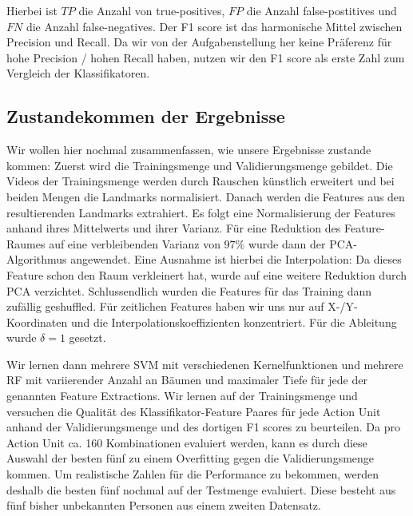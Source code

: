 Hierbei ist $TP$ die Anzahl von true-positives, $FP$ die Anzahl false-postitives und $FN$ die Anzahl false-negatives. Der F1 score ist das harmonische Mittel zwischen Precision und Recall. Da wir
von der Aufgabenstellung her keine Präferenz für hohe Precision / hohen Recall
haben, nutzen wir den F1 score als erste Zahl zum Vergleich der Klassifikatoren.

\subsection{Zustandekommen der Ergebnisse}
Wir wollen hier nochmal zusammenfassen, wie unsere Ergebnisse zustande kommen:
Zuerst wird die Trainingsmenge und Validierungsmenge gebildet.
Die Videos der Trainingsmenge werden durch Rauschen künstlich erweitert und bei beiden Mengen die Landmarks normalisiert.
Danach werden die Features aus den resultierenden Landmarks extrahiert.
Es folgt eine Normalisierung der Features anhand ihres Mittelwerts und ihrer Varianz. 
Für eine Reduktion des Feature-Raumes auf eine verbleibenden Varianz von $97\%$ wurde dann der PCA-Algorithmus angewendet.
Eine Ausnahme ist hierbei die Interpolation: Da dieses Feature schon den Raum verkleinert hat, wurde auf eine weitere Reduktion durch PCA verzichtet.
Schlussendlich wurden die Features für das Training dann zufällig geshuffled. Für zeitlichen Features haben wir uns nur auf X-/Y-Koordinaten und die Interpolationskoeffizienten konzentriert. Für die Ableitung wurde $\delta=1$ gesetzt.

Wir lernen dann mehrere SVM mit verschiedenen Kernelfunktionen und mehrere RF
mit variierender Anzahl an Bäumen und maximaler Tiefe für jede der genannten
Feature Extractions. Wir lernen auf der Trainingsmenge und versuchen die Qualität
des Klassifikator-Feature Paares für jede Action Unit anhand der
Validierungsmenge und des dortigen F1 scores zu beurteilen. Da pro Action Unit
ca. 160 Kombinationen evaluiert werden, kann es durch diese Auswahl der besten
fünf zu einem Overfitting gegen die Validierungsmenge kommen. Um realistische
Zahlen für die Performance zu bekommen, werden deshalb die besten fünf nochmal
auf der Testmenge evaluiert. Diese besteht aus fünf bisher unbekannten
Personen aus einem zweiten Datensatz.


